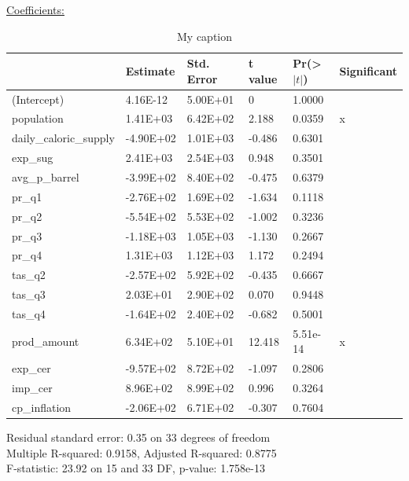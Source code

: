 \documentclass[12pt,a4paper,english]{article}
\begin{document}
\underline{Coefficients:}
\FloatBarrier
\begin{table}[!htbp]
\centering
\begin{tabular}{llllll}
\hline
                       & Estimate  & Std. Error & t value & Pr(\textgreater$|t|$) & Significant \\ \hline
(Intercept)            & 4.16E-12  & 5.00E+01   & 0       & 1.0000              &             \\
population             & 1.41E+03  & 6.42E+02   & 2.188   & 0.0359              & x           \\
daily\_caloric\_supply & -4.90E+02 & 1.01E+03   & -0.486  & 0.6301              &             \\
exp\_sug               & 2.41E+03  & 2.54E+03   & 0.948   & 0.3501              &             \\
avg\_p\_barrel         & -3.99E+02 & 8.40E+02   & -0.475  & 0.6379              &             \\
pr\_q1                 & -2.76E+02 & 1.69E+02   & -1.634  & 0.1118              &             \\
pr\_q2                 & -5.54E+02 & 5.53E+02   & -1.002  & 0.3236              &             \\
pr\_q3                 & -1.18E+03 & 1.05E+03   & -1.130  & 0.2667              &             \\
pr\_q4                 & 1.31E+03  & 1.12E+03   & 1.172   & 0.2494              &             \\
tas\_q2                & -2.57E+02 & 5.92E+02   & -0.435  & 0.6667              &             \\
tas\_q3                & 2.03E+01  & 2.90E+02   & 0.070   & 0.9448              &             \\
tas\_q4                & -1.64E+02 & 2.40E+02   & -0.682  & 0.5001              &             \\
prod\_amount           & 6.34E+02  & 5.10E+01   & 12.418  & 5.51e-14            & x           \\
exp\_cer               & -9.57E+02 & 8.72E+02   & -1.097  & 0.2806              &             \\
imp\_cer               & 8.96E+02  & 8.99E+02   & 0.996   & 0.3264              &             \\
cp\_inflation          & -2.06E+02 & 6.71E+02   & -0.307  & 0.7604              &            \\ \hline
\end{tabular}
\caption{My caption}
\label{my-label}
\end{table}
\FloatBarrier
Residual standard error: 0.35 on 33 degrees of freedom \\
Multiple R-squared:  0.9158,	Adjusted R-squared:  0.8775 \\ 
F-statistic: 23.92 on 15 and 33 DF,  p-value: 1.758e-13
\end{document}
